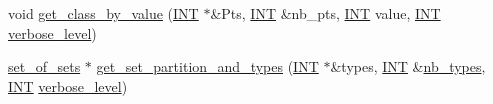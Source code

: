 \begin{DoxyCompactItemize}
\item 
void \mbox{\hyperlink{classclassify_ab3e85ad9a0a54ff66af9b555f1c33405}{get\+\_\+class\+\_\+by\+\_\+value}} (\mbox{\hyperlink{galois_8h_a09fddde158a3a20bd2dcadb609de11dc}{I\+NT}} $\ast$\&Pts, \mbox{\hyperlink{galois_8h_a09fddde158a3a20bd2dcadb609de11dc}{I\+NT}} \&nb\+\_\+pts, \mbox{\hyperlink{galois_8h_a09fddde158a3a20bd2dcadb609de11dc}{I\+NT}} value, \mbox{\hyperlink{galois_8h_a09fddde158a3a20bd2dcadb609de11dc}{I\+NT}} \mbox{\hyperlink{simeon_8_c_a818073fbcc2f439e7c56952f67386122}{verbose\+\_\+level}})
\item 
\mbox{\hyperlink{classset__of__sets}{set\+\_\+of\+\_\+sets}} $\ast$ \mbox{\hyperlink{classclassify_a7ea9543fd72149cd491b2cb57aa113d3}{get\+\_\+set\+\_\+partition\+\_\+and\+\_\+types}} (\mbox{\hyperlink{galois_8h_a09fddde158a3a20bd2dcadb609de11dc}{I\+NT}} $\ast$\&types, \mbox{\hyperlink{galois_8h_a09fddde158a3a20bd2dcadb609de11dc}{I\+NT}} \&\mbox{\hyperlink{classclassify_a0baeeb9626a0611f111335dcaaaaad5c}{nb\+\_\+types}}, \mbox{\hyperlink{galois_8h_a09fddde158a3a20bd2dcadb609de11dc}{I\+NT}} \mbox{\hyperlink{simeon_8_c_a818073fbcc2f439e7c56952f67386122}{verbose\+\_\+level}})
\end{DoxyCompactItemize}
